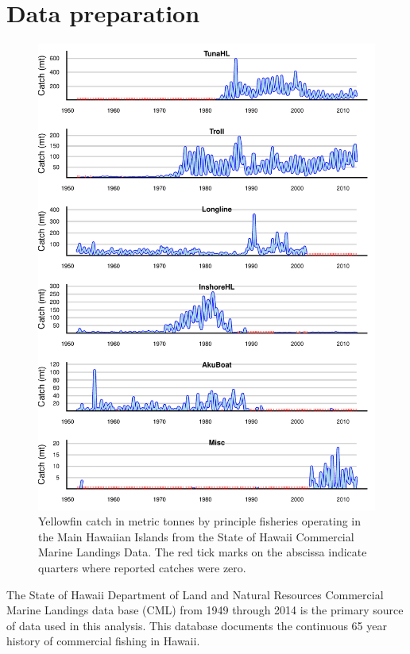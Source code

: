 \documentclass[12pt,letterpaper]{article}
\begin{document}
\clearpage


\appendix
\section{Data preparation}
\label{sec:data}

\begin{figure}
\begin{center}
\includegraphics[height=0.8\textheight]{./CML.pdf}
\caption{\label{fig:CMLdata}
Yellowfin catch in metric tonnes by principle fisheries operating in
the Main Hawaiian Islands from the State of Hawaii Commercial Marine
Landings Data.
The red tick marks on the abscissa indicate quarters where reported
catches were zero.
}
\end{center}
\end{figure}


The State of Hawaii Department of Land and Natural Resources
Commercial Marine Landings data base (CML) from 1949 through 2014 is
the primary source of data used in this analysis. This database
documents the
continuous 65 year history of commercial fishing in Hawaii.
\end{document}
